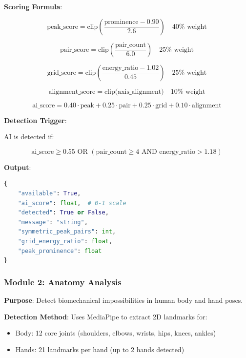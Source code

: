 \documentclass[12pt,a4paper]{book}
\begin{document}
\textbf{Scoring Formula}:

\begin{equation}
\text{peak\_score} = \text{clip}\left(\frac{\text{prominence} - 0.90}{2.6}\right) \quad 40\% \text{ weight}
\end{equation}

\begin{equation}
\text{pair\_score} = \text{clip}\left(\frac{\text{pair\_count}}{6.0}\right) \quad 25\% \text{ weight}
\end{equation}

\begin{equation}
\text{grid\_score} = \text{clip}\left(\frac{\text{energy\_ratio} - 1.02}{0.45}\right) \quad 25\% \text{ weight}
\end{equation}

\begin{equation}
\text{alignment\_score} = \text{clip(axis\_alignment)} \quad 10\% \text{ weight}
\end{equation}

\begin{equation}
\text{ai\_score} = 0.40 \cdot \text{peak} + 0.25 \cdot \text{pair} + 0.25 \cdot \text{grid} + 0.10 \cdot \text{alignment}
\end{equation}

\textbf{Detection Trigger}:

AI is detected if:

\begin{equation}
\text{ai\_score} \geq 0.55 \text{ OR } (\text{pair\_count} \geq 4 \text{ AND } \text{energy\_ratio} > 1.18)
\end{equation}

\textbf{Output}:
\begin{lstlisting}[language=Python]
{
    "available": True,
    "ai_score": float,  # 0-1 scale
    "detected": True or False,
    "message": "string",
    "symmetric_peak_pairs": int,
    "grid_energy_ratio": float,
    "peak_prominence": float
}
\end{lstlisting}

\subsubsection{Module 2: Anatomy Analysis}

\textbf{Purpose}: Detect biomechanical impossibilities in human body and hand poses.

\textbf{Detection Method}: Uses MediaPipe to extract 2D landmarks for:
\begin{itemize}
    \item Body: 12 core joints (shoulders, elbows, wrists, hips, knees, ankles)
    \item Hands: 21 landmarks per hand (up to 2 hands detected)
\end{itemize}
\end{document}
